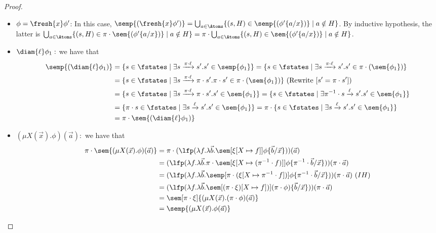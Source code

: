 \begin{proof}
\begin{itemize}
		In this case, $\semp{(\bigvee_{x}\phi_1)} = \bigcup_{a\in\Atoms}\semp{(\phi_1\{a/x\})}$. By inductive hypothesis, the latter is $\bigcup_{a\in\Atoms}\pi\cdot (\sem{(\phi_1\{a/x\})})=\pi\cdot (\bigcup_{a\in\Atoms}\sem{(\phi_1\{a/x\}})=\pi\cdot (\sem{\bigvee_{x}\phi_1})$.
		\item $\phi=\fresh{x}\phi'$:
		In this case, $\semp{(\fresh{x}\phi')} = \bigcup_{a\in\Atoms}\{(s, H) \in \semp{(\phi'\{a/x\})} \mid a \notin H\}$. 
		By inductive hypothesis, the latter is $\bigcup_{a\in\Atoms}\{(s, H) \in \pi \cdot \sem{(\phi'\{a/x\})} \mid a \notin H\}
		=\pi \cdot \bigcup_{a\in\Atoms}\{(s, H) \in \sem{(\phi'\{a/x\})} \mid a \notin H\}$.
		\item $\diam{\ell}\phi_1:$ we have that
		\begin{align*}
			\semp{(\diam{\ell}\phi_1)} &= \{s\in\fstates\mid\exists s\xrightarrow{\pi\cdot\ell} s' . s' \in \semp{\phi_1}\}
			= \{s\in\fstates\mid\exists s\xrightarrow{\pi\cdot\ell} s' . s' \in \pi\cdot(\sem{\phi_1})\}\\
			&= \{s\in\fstates\mid\exists s\xrightarrow{\pi\cdot\ell} \pi\cdot s' . \pi\cdot s' \in \pi\cdot(\sem{\phi_1})\}\ (\text{Rewrite}\ [s' = \pi\cdot s'])\\ 
			&= \{s\in\fstates\mid\exists s\xrightarrow{\pi\cdot\ell} \pi\cdot s' . s' \in \sem{\phi_1}\}
			= \{s\in\fstates\mid\exists \pi^{-1}\cdot s\xrightarrow{\ell} s' . s' \in \sem{\phi_1}\}\\
			&= \{\pi\cdot s\in\fstates\mid\exists s\xrightarrow{\ell} s' . s' \in \sem{\phi_1}\}
			= \pi\cdot\{s\in\fstates\mid\exists s\xrightarrow{\ell} s' . s' \in \sem{\phi_1}\}\\
			&= \pi\cdot\sem{(\diam{\ell}\phi_1)}
		\end{align*}
		\item $(\mu X(\vec x).\phi)(\vec a):$ we have that
    \begin{align*}
	\pi\cdot \sem{(\mu X(\vec x).\phi)(\vec a)} &= \pi\cdot(\lfp(\lambda f.\lambda\vec b. \sem[{\xi[X\mapsto f]}]{\phi\{\vec b/\vec x\}}))(\vec a)\\
	&= (\lfp(\lambda f.\lambda\vec b. \pi\cdot\sem[{\xi[X\mapsto (\pi^{-1}\cdot f)]}]{\phi\{\pi^{-1} \cdot \vec b/\vec x\}}))(\pi\cdot \vec a)\\
	&= (\lfp(\lambda f.\lambda\vec b. \semp[\pi\cdot(\xi{[X\mapsto \pi^{-1}\cdot f]})]{\phi\{\pi^{-1}\cdot \vec b / \vec x\}}))(\pi\cdot \vec a)\ (IH)\\
	&= (\lfp(\lambda f.\lambda\vec b. \sem[(\pi\cdot\xi){[X\mapsto f]})]{(\pi \cdot\phi)\{\vec b / \vec x\}}))(\pi\cdot \vec a)\\
	&= \sem[\pi\cdot\xi]{(\mu X(\vec x).(\pi\cdot\phi)(\vec a)}\\
	&= \semp{(\mu X(\vec x).\phi(\vec a)}
\end{align*}
		
	\end{itemize}
\end{proof}
